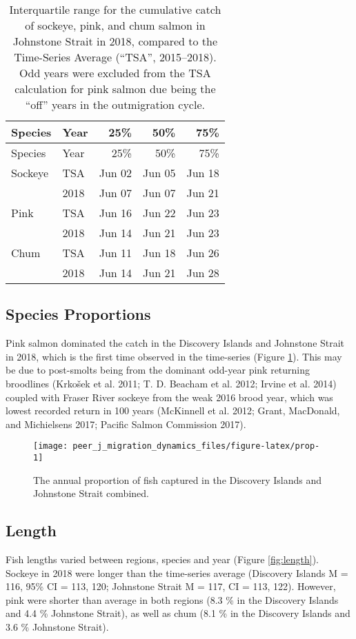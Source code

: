 \documentclass[fleqn,10pt]{wlpeerj} %
\begin{document}
\begin{longtable}[]{@{}llrrr@{}}
\caption{\label{tab:mtjs} Interquartile range for the cumulative catch of
sockeye, pink, and chum salmon in Johnstone Strait in 2018, compared to
the Time-Series Average (``TSA'', 2015--2018). Odd years were excluded
from the TSA calculation for pink salmon due being the ``off'' years in
the outmigration cycle.}\tabularnewline
\toprule
Species & Year & 25\% & 50\% & 75\%\tabularnewline
\midrule
\endfirsthead
\toprule
Species & Year & 25\% & 50\% & 75\%\tabularnewline
\midrule
\endhead
Sockeye & TSA & Jun 02 & Jun 05 & Jun 18\tabularnewline
~ & 2018 & Jun 07 & Jun 07 & Jun 21\tabularnewline
Pink & TSA & Jun 16 & Jun 22 & Jun 23\tabularnewline
~ & 2018 & Jun 14 & Jun 21 & Jun 23\tabularnewline
Chum & TSA & Jun 11 & Jun 18 & Jun 26\tabularnewline
~ & 2018 & Jun 14 & Jun 21 & Jun 28\tabularnewline
\bottomrule
\end{longtable}

\subsection*{Species Proportions}\label{species-proportions}

Pink salmon dominated the catch in the Discovery Islands and Johnstone
Strait in 2018, which is the first time observed in the time-series
(Figure \ref{fig:prop}). This may be due to post-smolts being from the
dominant odd-year pink returning broodlines (Krkošek et al. 2011; T. D.
Beacham et al. 2012; Irvine et al. 2014) coupled with Fraser River
sockeye from the weak 2016 brood year, which was lowest recorded return
in 100 years (McKinnell et al. 2012; Grant, MacDonald, and Michielsens
2017; Pacific Salmon Commission 2017).

\begin{figure}[H]
\texttt{[image: peer\_j\_migration\_dynamics\_files/figure-latex/prop-1]} \caption{The annual proportion of fish captured in the Discovery Islands and Johnstone Strait combined.}\label{fig:prop}
\end{figure}

\subsection*{Length}\label{length}

Fish lengths varied between regions, species and year (Figure
\ref{fig:length}). Sockeye in 2018 were longer than the time-series
average (Discovery Islands M = 116, 95\% CI = 113, 120; Johnstone Strait
M = 117, CI = 113, 122). However, pink were shorter than average in both
regions (8.3 \% in the Discovery Islands and 4.4 \% Johnstone Strait),
as well as chum (8.1 \% in the Discovery Islands and 3.6 \% Johnstone
Strait).
\end{document}
